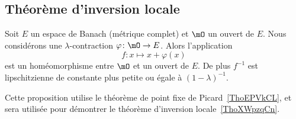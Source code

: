 \subsection{Théorème d'inversion locale}

\begin{lemma} \label{LemGZoqknC}
	Soit \( E\) un espace de Banach (métrique complet) et \( \mO\) un ouvert de \( E\). Nous considérons une \( \lambda\)-contraction \( \varphi\colon \mO\to E\). Alors l'application
	\begin{equation}
		f\colon x \mapsto x+\varphi(x)
	\end{equation}
	est un homéomorphisme entre \( \mO\) et un ouvert de \( E\). De plus \( f^{-1}\) est lipschitzienne de constante plus petite ou égale à \( (1-\lambda)^{-1}\).
\end{lemma}
Cette proposition utilise le théorème de point fixe de Picard~\ref{ThoEPVkCL}, et sera utilisée pour démontrer le théorème d'inversion locale~\ref{ThoXWpzqCn}.

